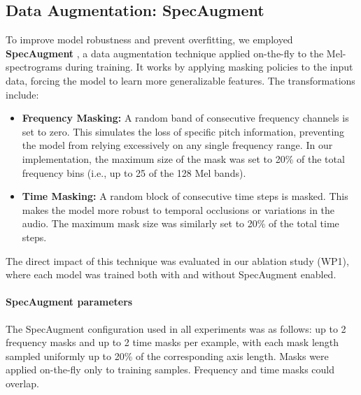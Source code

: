 \documentclass[11pt,a4paper]{article}
\begin{document}
\subsection{Data Augmentation: SpecAugment}
To improve model robustness and prevent overfitting, we employed \textbf{SpecAugment} \textbf{\cite{park2019specaugment}}, %
a data augmentation technique applied on-the-fly to the Mel-spectrograms during training. It works by applying masking policies to the input data, forcing the model to learn more generalizable features. The transformations include:
\begin{itemize}
    \item \textbf{Frequency Masking:} A random band of consecutive frequency channels is set to zero. This simulates the loss of specific pitch information, preventing the model from relying excessively on any single frequency range. In our implementation, the maximum size of the mask was set to 20\% of the total frequency bins (i.e., up to 25 of the 128 Mel bands).
    \item \textbf{Time Masking:} A random block of consecutive time steps is masked. This makes the model more robust to temporal occlusions or variations in the audio. The maximum mask size was similarly set to 20\% of the total time steps.
\end{itemize}
The direct impact of this technique was evaluated in our ablation study (WP1), where each model was trained both with and without SpecAugment enabled.

\paragraph{SpecAugment parameters}
The SpecAugment configuration used in all experiments was as follows: up to 2 frequency masks and up to 2 time masks per example, with each mask length sampled uniformly up to 20\% of the corresponding axis length. Masks were applied on-the-fly only to training samples. Frequency and time masks could overlap.
\end{document}
